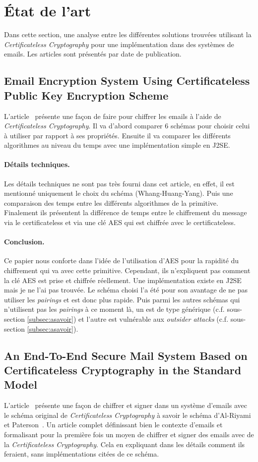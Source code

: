 \section{État de l'art}
Dans cette section, une analyse entre les différentes solutions trouvées utilisant la \textit{Certificateless Cryptography} pour une implémentation dans des systèmes de emails. Les articles sont présentés par date de publication. 

\subsection{Email Encryption System Using Certificateless Public Key Encryption Scheme}
L'article~\cite{conf/itcs2/ErYTG12} présente une façon de faire pour chiffrer les emails à l'aide de \textit{Certificateless Cryptography}. Il va d'abord comparer 6 schémas pour choisir celui à utiliser par rapport à ses propriétés. Ensuite il va comparer les différents algorithmes au niveau du temps avec une implémentation simple en J2SE. 
\paragraph*{Détails techniques.} Les détails techniques ne sont pas très fourni dans cet article, en effet, il est mentionné uniquement le choix du schéma (Whang-Huang-Yang). Puis une comparaison des temps entre les différents algorithmes de la primitive. Finalement ils présentent la différence de temps entre le chiffrement du message via le certificateless et via une clé AES qui est chiffrée avec le certificateless.
\paragraph*{Conclusion.} Ce papier nous conforte dans l'idée de l'utilisation d'AES pour la rapidité du chiffrement qui va avec cette primitive. Cependant, ils n'expliquent pas comment la clé AES est prise et chiffrée réellement. Une implémentation existe en J2SE mais je ne l'ai pas trouvée. Le schéma choisi l'a été pour son avantage de ne pas utiliser les \textit{pairings} et est donc plus rapide. Puis parmi les autres schémas qui n'utilisent pas les \textit{pairings} à ce moment là, un est de type générique (c.f. sous-section \ref{subsec:asavoir}) et l'autre est vulnérable aux \textit{outsider attacks} (c.f. sous-section \ref{subsec:asavoir}).

\subsection{An End-To-End Secure Mail System Based on Certificateless Cryptography in the Standard Model}
L'article~\cite{endToEndSecureEmailArticle} présente une façon de chiffrer et signer dans un système d'emails avec le schéma original de \textit{Certificateless Cryptography} à savoir le schéma d'Al-Riyami et Paterson~\cite{conf/asiacrypt/Al-RiyamiP03}. Un article complet définissant bien le contexte d'emails et formalisant pour la première fois un moyen de chiffrer et signer des emails avec de la \textit{Certificateless Cryptography}. Cela en expliquant dans les détails comment ils feraient, sans implémentations citées de ce schéma.
